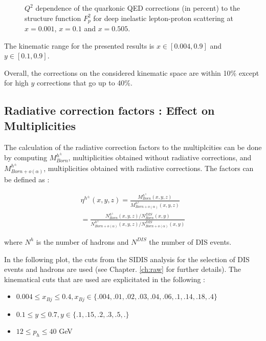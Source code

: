 \begin{figure}[htb]
\centerline{}
\caption{$Q^2$ dependence of the quarkonic QED corrections (in percent) to the structure function $F^2_p$ for deep inelastic
lepton-proton scattering at $x=0.001$, $x=0.1$ and $x=0.505$.}\label{fig:quarkline}
\end{figure}

The kinematic range for the presented results is $x \in [0.004,0.9]$ and $y \in [0.1,0.9]$.

Overall, the corrections on the considered kinematic space are within 10\% except for high $y$ corrections
that go up to 40\%.

\subsection{Radiative correction factors : Effect on Multiplicities}\label{sec:RCFMult}

The calculation of the radiative correction factors to the multiplcities can be done by computing
$M^{h^{\pm}}_{Born}$, multiplicities obtained without radiative corrections, and $M^{h^{\pm}}_{Born+o(\alpha)}$,
multiplicities obtained with radiative corrections. The factors can be defined as :

\begin{equation}
  \begin{split}
    \eta^{h^{\pm}}(x,y,z)=\frac{M^{h^{\pm}}_{Born}(x,y,z)}{M^{h^{\pm}}_{Born+o(\alpha)}(x,y,z)} \\
     = \frac{N^{h^{\pm}}_{Born}(x,y,z)/N^{DIS}_{Born}(x,y)}{N^{h^{\pm}}_{Born+o(\alpha)}(x,y,z)/N^{DIS}_{Born+o(\alpha)}(x,y)}
  \end{split}
\end{equation}

where $N^h$ is the number of hadrons and $N^{DIS}$ the number of DIS events.


In the following plot, the cuts from the SIDIS analysis for the selection of DIS events and
hadrons are used (see Chapter. \ref{ch:raw} for further details). The kinematical cuts that are used are explicitated in the following :

\begin{itemize}
\item $0.004 \leq x_{Bj} \leq 0.4, x_{Bj} \in \{.004,.01,.02,.03,.04,.06,.1,.14,.18,.4\}$
\item $0.1 \leq y \leq 0.7, y \in \{.1,.15,.2,.3,.5,.\}$
\item $12 \leq p_h \leq 40$ GeV
\end{itemize}

